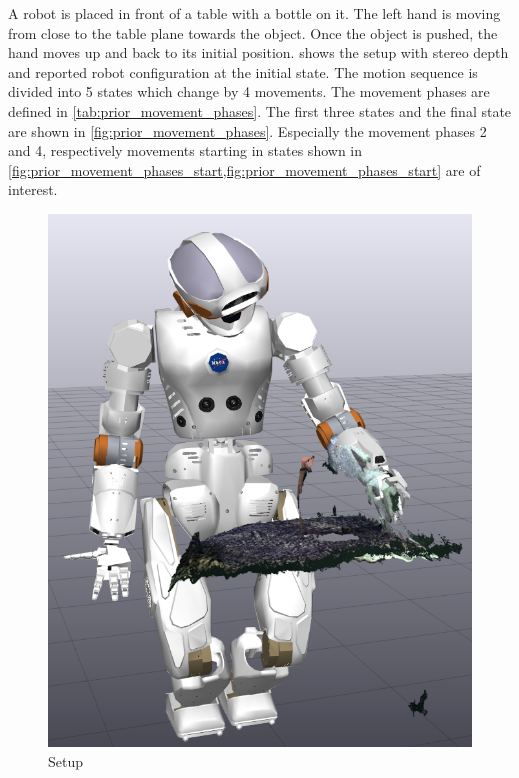 A robot is placed in front of a table with a bottle on it. The left hand is moving from close to the table plane towards the object. Once the object is pushed, the hand moves up and back to its initial position.
 shows the setup with stereo depth and reported robot configuration at the initial state.
The motion sequence is divided into 5 states which change by 4 movements. The movement phases are defined in \cref{tab:prior_movement_phases}. The first three states and the final state are shown in \cref{fig:prior_movement_phases}.
Especially the movement phases 2 and 4, respectively movements starting in states shown in \cref{fig:prior_movement_phases_start,fig:prior_movement_phases_start} are of interest.

\begin{figure}
\centering
\begin{minipage}{0.45\textwidth}
\centering
\includegraphics[width=1.0\textwidth]{images/eval_prior/sequence/prior_setting.png} 
\caption{Setup}
\label{fig:prior_setting}
\end{minipage}

\end{figure}
